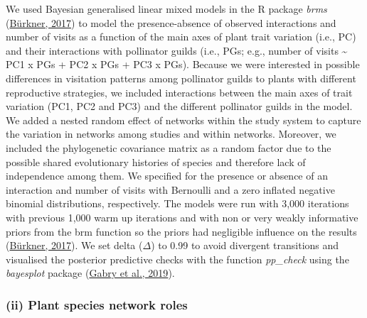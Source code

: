 \documentclass[
  12pt,
  a4paper,
]{article}
\begin{document}
We used Bayesian generalised linear mixed models in the R package \emph{brms} (\protect\hyperlink{ref-burkner2017}{Bürkner, 2017}) to model the presence-absence of observed interactions and number of visits as a function of the main axes of plant trait variation (i.e., PC) and their interactions with pollinator guilds (i.e., PGs; e.g., number of visits \textasciitilde{} PC1 x PGs + PC2 x PGs + PC3 x PGs). Because we were interested in possible differences in visitation patterns among pollinator guilds to plants with different reproductive strategies, we included interactions between the main axes of trait variation (PC1, PC2 and PC3) and the different pollinator guilds in the model. We added a nested random effect of networks within the study system to capture the variation in networks among studies and within networks. Moreover, we included the phylogenetic covariance matrix as a random factor due to the possible shared evolutionary histories of species and therefore lack of independence among them. We specified for the presence or absence of an interaction and number of visits with Bernoulli and a zero inflated negative binomial distributions, respectively. The models were run with 3,000 iterations with previous 1,000 warm up iterations and with non or very weakly informative priors from the brm function so the priors had negligible influence on the results (\protect\hyperlink{ref-burkner2017}{Bürkner, 2017}). We set delta (\(\Delta\)) to 0.99 to avoid divergent transitions and visualised the posterior predictive checks with the function \emph{pp\_check} using the \emph{bayesplot} package (\protect\hyperlink{ref-gabry2019}{Gabry et al., 2019}).

\hypertarget{ii-plant-species-network-roles}{%
\subsubsection{(ii) Plant species network roles}\label{ii-plant-species-network-roles}}
\end{document}
